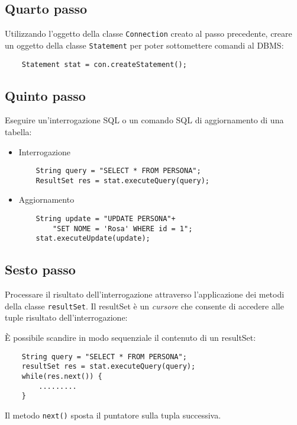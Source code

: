 \documentclass[a4paper, 10pt]{article}
\theoremstyle{definition}
\begin{document}
			\subsection*{Quarto passo}
				Utilizzando l'oggetto della classe \lstinline|Connection| creato
				al passo precedente, creare un oggetto della classe
				\lstinline|Statement| per poter sottomettere comandi al
				DBMS:
				\begin{lstlisting}
	Statement stat = con.createStatement();
				\end{lstlisting}
				
			\subsection*{Quinto passo}
				Eseguire un'interrogazione SQL o un comando SQL di
				aggiornamento di una tabella:
				\begin{itemize}
					\item Interrogazione
					\begin{lstlisting}
	String query = "SELECT * FROM PERSONA";
	ResultSet res = stat.executeQuery(query);
					\end{lstlisting}
					\item Aggiornamento
					\begin{lstlisting}
	String update = "UPDATE PERSONA"+
		"SET NOME = 'Rosa' WHERE id = 1";
	stat.executeUpdate(update);
					\end{lstlisting}
				\end{itemize}
				
			\subsection*{Sesto passo}
				Processare il risultato dell'interrogazione attraverso
				l'applicazione dei metodi della classe \lstinline|resultSet|.
				Il resultSet è un \textit{cursore} che consente di accedere alle
				tuple risultato dell'interrogazione:
				
				È possibile scandire in modo sequenziale il
				contenuto di un resultSet:
				
				\begin{lstlisting}
	String query = "SELECT * FROM PERSONA";
	resultSet res = stat.executeQuery(query);
	while(res.next()) {
		.........
	}
				\end{lstlisting}
				
				Il metodo \lstinline|next()| sposta il puntatore sulla tupla
				successiva.
				
\end{document}
